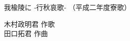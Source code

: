 \documentclass[10pt,b5j]{tarticle} %
\begin{document}
\begin{minipage}[c]{0.7\hsize} %
    \begin{center}
        {\LARGE
            我楡陵に %
        }
        {\large 
            ‐行秋哀歌‐ %
        }
        {\small 
            （平成二年度寮歌） %
        }
    \end{center}
\end{minipage}
\begin{minipage}[c]{0.3\hsize} %
    \begin{flushright} %
        木村政明君 作歌\\田口拓君 作曲 %
    \end{flushright}
\end{minipage}
\end{document}
